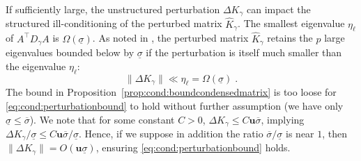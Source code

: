 \documentclass[smallextended]{svjour3}
\newcommand{\epstol}{\mathbf{u}}
\begin{document}
If sufficiently large, the unstructured perturbation $\Delta K_\gamma$
can impact the structured ill-conditioning of the perturbed matrix $\widehat{K}_\gamma$.
The smallest eigenvalue $\eta_\ell$ of $A^\top D_\gamma A$ is $\Omega(\underline{\sigma})$. As noted in
\cite[Section 3.4.2]{wright1998ill}, the perturbed matrix $\widehat{K}_\gamma$ retains the $p$ large eigenvalues
bounded below by $\underline{\sigma}$ if the perturbation is itself much smaller than the eigenvalue $\eta_\ell$:
\begin{equation}
  \label{eq:cond:perturbationbound}
  \| \Delta K_\gamma \| \ll \eta_\ell = \Omega(\underline{\sigma})  \; .
\end{equation}
The bound in Proposition~\ref{prop:cond:boundcondensedmatrix} is too loose
for \eqref{eq:cond:perturbationbound} to hold without further assumption
(we have only $\underline{\sigma} \leq \overline{\sigma}$).
We note that for some constant $C > 0$, $\Delta K_\gamma \leq C \epstol \overline{\sigma}$,
implying $\Delta K_\gamma / \underline{\sigma} \leq C \epstol \overline{\sigma} / \underline{\sigma}$.
Hence, if we suppose in addition the ratio $\overline{\sigma}/\underline{\sigma}$ is near $1$, then
$\| \Delta K_\gamma\|= O(\epstol \underline{\sigma})$, ensuring \eqref{eq:cond:perturbationbound} holds.
\end{document}
